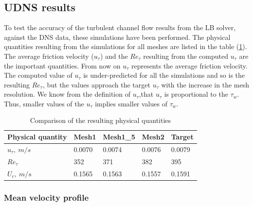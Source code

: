 \subsection{UDNS results} \label{UDNS profiles}
To test the accuracy of the turbulent channel flow results from the LB solver, against the DNS data, these simulations have been performed. The physical quantities resulting from the simulations for all meshes are listed in the table (\ref{Global quantities}). The average friction velocity ($u_\tau$) and the $Re_\tau$ resulting from the computed $u_\tau$ are the important quantities. From now on $u_\tau$ represents the average friction velocity. The computed value of $u_\tau$ is under-predicted for all the simulations and so is the resulting $Re_\tau$, but the values approach the target $u_\tau$ with the increase in the mesh resolution. We know from the definition of $u_\tau$,that $u_\tau$ is proportional to the $\tau_w$. Thus, smaller values of the $u_\tau$ implies smaller values of $\tau_w$.  
%
\begin{table}[h!]
\begin{center}
\begin{tabular}{ p{3cm}|p{1.5cm}p{1.5cm}p{1.5cm}p{1.5cm}  } 
\hline
Physical quantity & Mesh1 & Mesh1\_5 & Mesh2 & Target \\
  \hline
  \multirow{1}{6em}{$u_\tau,\ m/s$}  & 0.0070 & 0.0074 & 0.0076 & 0.0079\\
  \hline
  \multirow{1}{6em}{$Re_\tau$} & 352 & 371 & 382 & 395\\
  \hline
  \multirow{1}{6em}{$U_c,\ m/s$} & 0.1565 & 0.1563 & 0.1557 & 0.1591\\
  \hline
\end{tabular}
\end{center}
\caption{Comparison of the resulting physical quantities}
\label{Global quantities}
\end{table}
%
\subsubsection{Mean velocity profile} \label{Mean velocity UDNS}

